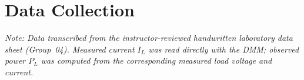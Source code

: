 \section{Data Collection}

\begin{table}[h!]
    \centering
    \caption{Experimental Measurement Log for Maximum Power Transfer Evaluation ($V_{th}=\qty{8}{\volt}$, $R_i=\qty{663}{\ohm}$)}
    \vspace{2mm}
    \label{tab:maxpowerdata}
\end{table}

\textit{Note: Data transcribed from the instructor-reviewed handwritten laboratory data sheet (Group~04). Measured current $I_L$ was read directly with the DMM; observed power $P_L$ was computed from the corresponding measured load voltage and current.}

